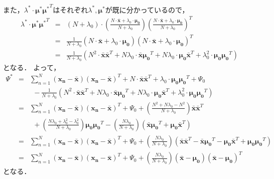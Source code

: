 \documentclass[a4j]{jarticle}
\begin{document}
また，$\lambda^* \cdot \boldsymbol{\mu^*}\boldsymbol{\mu^*}^T$はそれぞれ$\lambda^*, \boldsymbol{\mu^*}$が既に分かっているので，
\begin{eqnarray}
\lambda^* \cdot \boldsymbol{\mu^*}\boldsymbol{\mu^*}^T &=& (N + \lambda_0) \cdot \left( \frac{N \cdot \boldsymbol{\bar{x}} + \lambda_0 \cdot \boldsymbol{\mu_0}}{N + \lambda_0} \right) \left( \frac{N \cdot \boldsymbol{\bar{x}} + \lambda_0 \cdot \boldsymbol{\mu_0}}{N + \lambda_0} \right)^T \\
&=&
\frac{1}{N + \lambda_0} \left( N \cdot \boldsymbol{\bar{x}} + \lambda_0 \cdot \boldsymbol{\mu_0} \right) \left( N \cdot \boldsymbol{\bar{x}} + \lambda_0 \cdot \boldsymbol{\mu_0} \right)^T\\
&=&
\frac{1}{N + \lambda_0} \left( N^2 \cdot \boldsymbol{\bar{x}} \boldsymbol{\bar{x}}^T + N \lambda_0 \cdot \boldsymbol{\bar{x}} \boldsymbol{\mu_0}^T + N \lambda_0 \cdot \boldsymbol{\mu_0} \boldsymbol{\bar{x}}^T + \lambda_0^2 \cdot \boldsymbol{\mu_0} \boldsymbol{\mu_0}^T \right)
\end{eqnarray}
となる．
よって，
\begin{eqnarray}
\Psi^* &=& \sum_{n=1}^{N}{(\boldsymbol{x_n} - \boldsymbol{\bar{x}}) (\boldsymbol{x_n} - \boldsymbol{\bar{x}})^T}  + N \cdot \boldsymbol{\bar{x}} \boldsymbol{\bar{x}}^T + \lambda_0 \cdot \boldsymbol{\mu_0} \boldsymbol{\mu_0}^T + \Psi_0 \nonumber \\
&&~~ - \frac{1}{N + \lambda_0} \left( N^2 \cdot \boldsymbol{\bar{x}} \boldsymbol{\bar{x}}^T + N \lambda_0 \cdot \boldsymbol{\bar{x}} \boldsymbol{\mu_0}^T + N \lambda_0 \cdot \boldsymbol{\mu_0} \boldsymbol{\bar{x}}^T + \lambda_0^2 \cdot \boldsymbol{\mu_0} \boldsymbol{\mu_0}^T \right) \\
&=&
\sum_{n=1}^{N}{(\boldsymbol{x_n} - \boldsymbol{\bar{x}}) (\boldsymbol{x_n} - \boldsymbol{\bar{x}})^T} + \Psi_0 + \left( \frac{N^2 + N \lambda_0 - N^2}{N + \lambda_0} \right) \boldsymbol{\bar{x}} \boldsymbol{\bar{x}}^T \nonumber \\
&&
~~ + \left( \frac{N \lambda_0 + \lambda_0^2 - \lambda_0^2}{N + \lambda_0} \right) \boldsymbol{\mu_0} \boldsymbol{\mu_0}^T - \left( \frac{N \lambda_0}{N + \lambda_0} \right) \left( \boldsymbol{\bar{x}} \boldsymbol{\mu_0}^T + \boldsymbol{\mu_0} \boldsymbol{\bar{x}}^T \right) \\
&=&
\sum_{n=1}^{N}{(\boldsymbol{x_n} - \boldsymbol{\bar{x}}) (\boldsymbol{x_n} - \boldsymbol{\bar{x}})^T} + \Psi_0 + \left( \frac{N \lambda_0}{N + \lambda_0} \right) \left( \boldsymbol{\bar{x}} \boldsymbol{\bar{x}}^T - \boldsymbol{\bar{x}} \boldsymbol{\mu_0}^T - \boldsymbol{\mu_0} \boldsymbol{\bar{x}}^T + \boldsymbol{\mu_0} \boldsymbol{\mu_0}^T\right) \\
&=&
\sum_{n=1}^{N}{(\boldsymbol{x_n} - \boldsymbol{\bar{x}}) (\boldsymbol{x_n} - \boldsymbol{\bar{x}})^T} + \Psi_0 + \left( \frac{N \lambda_0}{N + \lambda_0} \right) \left( \boldsymbol{\bar{x}} - \boldsymbol{\mu_0} \right) \left( \boldsymbol{\bar{x}} - \boldsymbol{\mu_0} \right)^T
\end{eqnarray}
となる．
\end{document}
